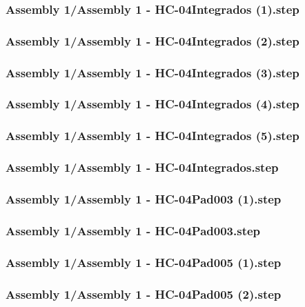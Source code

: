 \documentclass[a4paper,12pt]{article}
\begin{document}
\begin{lstlising}[language=C++]
\subsubsection{Assembly 1/Assembly 1 - HC-04Integrados (1).step}

\subsubsection{Assembly 1/Assembly 1 - HC-04Integrados (2).step}

\subsubsection{Assembly 1/Assembly 1 - HC-04Integrados (3).step}

\subsubsection{Assembly 1/Assembly 1 - HC-04Integrados (4).step}

\subsubsection{Assembly 1/Assembly 1 - HC-04Integrados (5).step}

\subsubsection{Assembly 1/Assembly 1 - HC-04Integrados.step}

\subsubsection{Assembly 1/Assembly 1 - HC-04Pad003 (1).step}

\subsubsection{Assembly 1/Assembly 1 - HC-04Pad003.step}

\subsubsection{Assembly 1/Assembly 1 - HC-04Pad005 (1).step}

\subsubsection{Assembly 1/Assembly 1 - HC-04Pad005 (2).step}


\end{lstlising}
\end{document}
